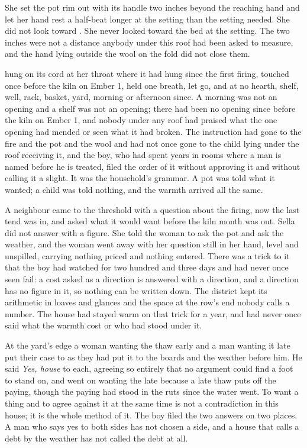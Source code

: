 She set the pot rim out with its handle two inches beyond the reaching hand and let her hand rest a half-beat longer at the setting than the setting needed. She did not look toward . She never looked toward the bed at the setting. The two inches were not a distance anybody under this roof had been asked to measure, and the hand lying outside the wool on the fold did not close them.

 hung on its cord at her throat where it had hung since the first firing, touched once before the kiln on Ember 1, held one breath, let go, and at no hearth, shelf, well, rack, basket, yard, morning or afternoon since. A morning was not an opening and a shelf was not an opening; there had been no opening since before the kiln on Ember 1, and nobody under any roof had praised what the one opening had mended or seen what it had broken. The instruction had gone to the fire and the pot and the wool and had not once gone to the child lying under the roof receiving it, and the boy, who had spent years in rooms where a man is named before he is treated, filed the order of it without approving it and without calling it a slight. It was the household's grammar. A pot was told what it wanted; a child was told nothing, and the warmth arrived all the same.

A neighbour came to the threshold with a question about the firing, now the last tend was in, and asked what it would want before the kiln month was out. Sella did not answer with a figure. She told the woman to ask the pot and ask the weather, and the woman went away with her question still in her hand, level and unspilled, carrying nothing priced and nothing entered. There was a trick to it that the boy had watched for two hundred and three days and had never once seen fail: a cost asked as a direction is answered with a direction, and a direction has no figure in it, so nothing can be written down. The district kept its arithmetic in loaves and glances and the space at the row's end nobody calls a number. The house had stayed warm on that trick for a year, and had never once said what the warmth cost or who had stood under it.

At the yard's edge a woman wanting the thaw early and a man wanting it late put their case to  as they had put it to the boards and the weather before him. He said \emph{Yes, house} to each, agreeing so entirely that no argument could find a foot to stand on, and went on wanting the late because a late thaw puts off the paying, though the paying had stood in the ruts since the water went. To want a thing and to agree against it at the same time is not a contradiction in this house; it is the whole method of it. The boy filed the two answers on two places. A man who says yes to both sides has not chosen a side, and a house that calls a debt by the weather has not called the debt at all.

